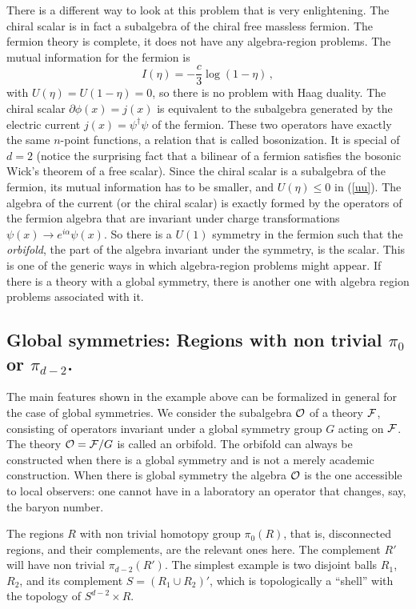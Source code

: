 \documentclass[11pt]{article}
\numberwithin{equation}{section}
\newcommand{\be}{\begin{equation}}
\newcommand{\ee}{\end{equation}}
\begin{document}
There is a different way to look at this problem that is very enlightening. The chiral scalar is in fact a subalgebra of the chiral free massless fermion. The fermion theory is complete, it does not have any algebra-region problems. The mutual information for the fermion is
\be
I(\eta)=-\frac{c}{3} \log(1-\eta)\,,
\ee
with $U(\eta)=U(1-\eta)=0$, so there is no problem with Haag duality. 
The chiral scalar $\partial \phi(x)=j(x)$ is equivalent to the subalgebra generated by the electric current $j(x)=\psi^\dagger\psi$ of the fermion. These two operators have exactly the same $n$-point functions, a relation that is called bosonization. It is special of $d=2$ (notice the surprising fact that a bilinear of a fermion satisfies the bosonic Wick's theorem of a free scalar). Since the chiral scalar is a subalgebra of the fermion, its mutual information has to be smaller, and $U(\eta)\le 0$ in (\ref{uu}).
 The algebra of the current (or the chiral scalar) is exactly formed by the operators of the fermion algebra that are invariant under charge transformations $\psi(x)\rightarrow e^{i\alpha} \psi(x)$. So there is a $U(1)$ symmetry in the fermion such that the {\sl orbifold}, the part of the algebra invariant under the symmetry, is the scalar. This is one of the generic ways in which algebra-region problems might appear. If there is a theory with a global symmetry, there is another one with algebra region problems associated with it.   



\subsection{Global symmetries: Regions with non trivial $\pi_0$ or $\pi_{d-2}$.}
\label{global}
The main features shown in the example above can be formalized in general for the case of global symmetries. 
We consider the subalgebra ${\cal O}$ of a theory ${\cal F}$, consisting of operators invariant under a global symmetry group $G$ acting on ${\cal F}$. The theory ${\cal O}={\cal F}/G$ is called an orbifold. The orbifold can always be constructed when there is a global symmetry and is not a merely academic construction. When there is global symmetry the algebra ${\cal O}$ is the one accessible to local observers: one cannot have in a laboratory an operator that changes, say, the baryon number.     

The regions $R$ with non trivial homotopy group $\pi_0(R)$, that is, disconnected regions, and their complements,  are the relevant ones here. The complement $R'$ will have non trivial $\pi_{d-2}(R')$.  The simplest example is two disjoint balls $R_1$, $R_2$, and its complement $S=(R_1\cup R_2)'$, which is topologically a ``shell'' with the topology of $S^{d-2}\times R$. 
\end{document}
